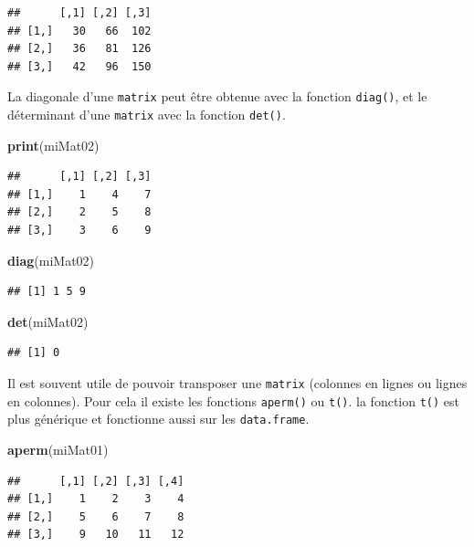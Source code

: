 \documentclass[
]{book}
\newenvironment{Shaded}{\begin{snugshade}}{\end{snugshade}}
\newcommand{\KeywordTok}[1]{\textcolor[rgb]{0.13,0.29,0.53}{\textbf{#1}}}
\newcommand{\NormalTok}[1]{#1}
\begin{document}
\begin{verbatim}
##      [,1] [,2] [,3]
## [1,]   30   66  102
## [2,]   36   81  126
## [3,]   42   96  150
\end{verbatim}

La diagonale d'une \texttt{matrix} peut être obtenue avec la fonction \texttt{diag()}, et le déterminant d'une \texttt{matrix} avec la fonction \texttt{det()}.

\begin{Shaded}
\begin{Highlighting}[]
\KeywordTok{print}\NormalTok{(miMat02)}
\end{Highlighting}
\end{Shaded}

\begin{verbatim}
##      [,1] [,2] [,3]
## [1,]    1    4    7
## [2,]    2    5    8
## [3,]    3    6    9
\end{verbatim}

\begin{Shaded}
\begin{Highlighting}[]
\KeywordTok{diag}\NormalTok{(miMat02)}
\end{Highlighting}
\end{Shaded}

\begin{verbatim}
## [1] 1 5 9
\end{verbatim}

\begin{Shaded}
\begin{Highlighting}[]
\KeywordTok{det}\NormalTok{(miMat02)}
\end{Highlighting}
\end{Shaded}

\begin{verbatim}
## [1] 0
\end{verbatim}

Il est souvent utile de pouvoir transposer une \texttt{matrix} (colonnes en lignes ou lignes en colonnes). Pour cela il existe les fonctions \texttt{aperm()} ou \texttt{t()}. la fonction \texttt{t()} est plus générique et fonctionne aussi sur les \texttt{data.frame}.

\begin{Shaded}
\begin{Highlighting}[]
\KeywordTok{aperm}\NormalTok{(miMat01)}
\end{Highlighting}
\end{Shaded}

\begin{verbatim}
##      [,1] [,2] [,3] [,4]
## [1,]    1    2    3    4
## [2,]    5    6    7    8
## [3,]    9   10   11   12
\end{verbatim}
\end{document}
